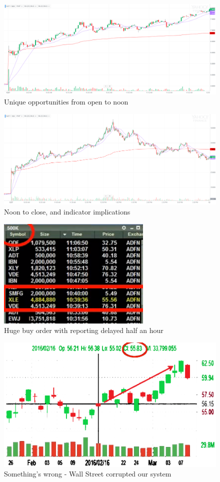 \documentclass{article}
\begin{document}
\vspace{10pt}

\begin{figure}[!htb]
    \centering
    \includegraphics[width=\textwidth]{imgs/114.png}
    \caption{Unique opportunities from open to noon}
\end{figure}

\vspace{10pt}

\begin{figure}[!htb]
    \centering
    \includegraphics[width=\textwidth]{imgs/115.png}
    \caption{Noon to close, and indicator implications}
\end{figure}

\vspace{10pt}

\begin{figure}[!htb]
    \centering
    \includegraphics[width=.5\textwidth]{imgs/116.png}
    \caption{Huge buy order with reporting delayed half an hour}
\end{figure}

\vspace{10pt}

\begin{figure}[!htb]
    \centering
    \includegraphics[width=.7\textwidth]{imgs/117.png}
    \caption{Something's wrong - Wall Street corrupted our system}
\end{figure}
\end{document}
